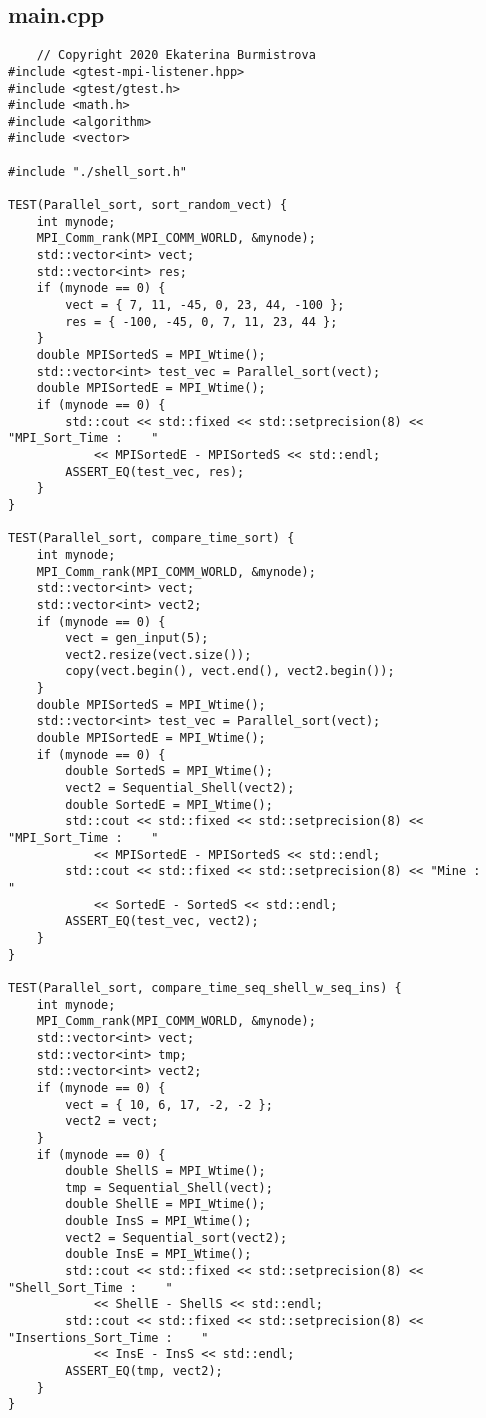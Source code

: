 \documentclass{report}
\begin{document}
    \subsection*{main.cpp}
 	\begin{verbatim}
 	// Copyright 2020 Ekaterina Burmistrova
#include <gtest-mpi-listener.hpp>
#include <gtest/gtest.h>
#include <math.h>
#include <algorithm>
#include <vector>

#include "./shell_sort.h"

TEST(Parallel_sort, sort_random_vect) {
    int mynode;
    MPI_Comm_rank(MPI_COMM_WORLD, &mynode);
    std::vector<int> vect;
    std::vector<int> res;
    if (mynode == 0) {
        vect = { 7, 11, -45, 0, 23, 44, -100 };
        res = { -100, -45, 0, 7, 11, 23, 44 };
    }
    double MPISortedS = MPI_Wtime();
    std::vector<int> test_vec = Parallel_sort(vect);
    double MPISortedE = MPI_Wtime();
    if (mynode == 0) {
        std::cout << std::fixed << std::setprecision(8) << "MPI_Sort_Time :    "
            << MPISortedE - MPISortedS << std::endl;
        ASSERT_EQ(test_vec, res);
    }
}

TEST(Parallel_sort, compare_time_sort) {
    int mynode;
    MPI_Comm_rank(MPI_COMM_WORLD, &mynode);
    std::vector<int> vect;
    std::vector<int> vect2;
    if (mynode == 0) {
        vect = gen_input(5);
        vect2.resize(vect.size());
        copy(vect.begin(), vect.end(), vect2.begin());
    }
    double MPISortedS = MPI_Wtime();
    std::vector<int> test_vec = Parallel_sort(vect);
    double MPISortedE = MPI_Wtime();
    if (mynode == 0) {
        double SortedS = MPI_Wtime();
        vect2 = Sequential_Shell(vect2);
        double SortedE = MPI_Wtime();
        std::cout << std::fixed << std::setprecision(8) << "MPI_Sort_Time :    "
            << MPISortedE - MPISortedS << std::endl;
        std::cout << std::fixed << std::setprecision(8) << "Mine :    "
            << SortedE - SortedS << std::endl;
        ASSERT_EQ(test_vec, vect2);
    }
}

TEST(Parallel_sort, compare_time_seq_shell_w_seq_ins) {
    int mynode;
    MPI_Comm_rank(MPI_COMM_WORLD, &mynode);
    std::vector<int> vect;
    std::vector<int> tmp;
    std::vector<int> vect2;
    if (mynode == 0) {
        vect = { 10, 6, 17, -2, -2 };
        vect2 = vect;
    }
    if (mynode == 0) {
        double ShellS = MPI_Wtime();
        tmp = Sequential_Shell(vect);
        double ShellE = MPI_Wtime();
        double InsS = MPI_Wtime();
        vect2 = Sequential_sort(vect2);
        double InsE = MPI_Wtime();
        std::cout << std::fixed << std::setprecision(8) << "Shell_Sort_Time :    "
            << ShellE - ShellS << std::endl;
        std::cout << std::fixed << std::setprecision(8) << "Insertions_Sort_Time :    "
            << InsE - InsS << std::endl;
        ASSERT_EQ(tmp, vect2);
    }
}


\end{verbatim}
\end{document}
